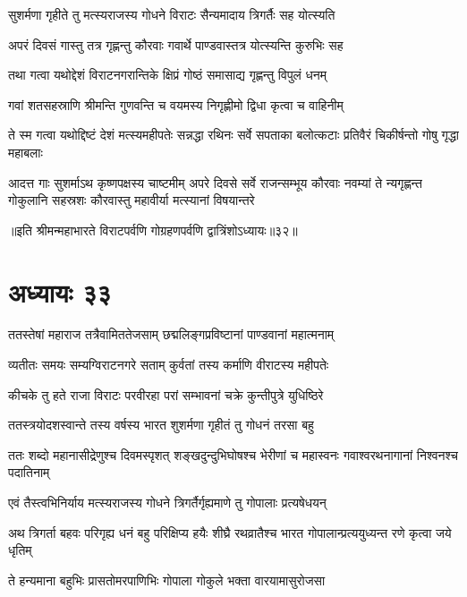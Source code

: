 \twolineshloka
{सुशर्मणा गृहीते तु मत्स्यराजस्य गोधने}
{विराटः सैन्यमादाय त्रिगर्तैः सह योत्स्यति}


\twolineshloka
{अपरं दिवसं गास्तु तत्र गृह्णन्तु कौरवाः}
{गवार्थे पाण्डवास्तत्र योत्स्यन्ति कुरुभिः सह}


\twolineshloka
{तथा गत्वा यथोद्देशं विराटनगरान्तिके}
{क्षिप्रं गोष्ठं समासाद्य गृह्णन्तु विपुलं धनम्}


\twolineshloka
{गवां शतसहस्राणि श्रीमन्ति गुणवन्ति च}
{वयमस्य निगृह्णीमो द्विधा कृत्वा च वाहिनीम्}



\threelineshloka
{ते स्म गत्वा यथोद्दिष्टं देशं मत्स्यमहीपतेः}
{सन्नद्धा रथिनः सर्वे सपताका बलोत्कटाः}
{प्रतिवैरं चिकीर्षन्तो गोषु गृद्धा महाबलाः}


\onelineshloka
{आदत्त गाः सुशर्माऽथ कृष्णपक्षस्य चाष्टमीम्}
\threelineshloka
{अपरे दिवसे सर्वे राजन्सम्भूय कौरवाः}
{नवम्यां ते न्यगृह्णन्त गोकुलानि सहस्रशः}
{कौरवास्तु महावीर्या मत्स्यानां विषयान्तरे}

॥इति श्रीमन्महाभारते विराटपर्वणि गोग्रहणपर्वणि द्वात्रिंशोऽध्यायः॥३२॥

\chapter{अध्यायः ३३}

\twolineshloka
{ततस्तेषां महाराज तत्रैवामिततेजसाम्}
{छद्मलिङ्गप्रविष्टानां पाण्डवानां महात्मनाम्}


\twolineshloka
{व्यतीतः समयः सम्यग्विराटनगरे सताम्}
{कुर्वतां तस्य कर्माणि वीराटस्य महीपतेः}


\twolineshloka
{कीचके तु हते राजा विराटः परवीरहा}
{परां सम्भावनां चक्रे कुन्तीपुत्रे युधिष्ठिरे}


\twolineshloka
{ततस्त्रयोदशस्वान्ते तस्य वर्षस्य भारत}
{शुशर्मणा गृहीतं तु गोधनं तरसा बहु}


\threelineshloka
{ततः शब्दो महानासीद्रेणुश्च दिवमस्पृशत्}
{शङ्खदुन्दुभिघोषश्च भेरीणां च महास्वनः}
{गवाश्वरथनागानां निश्वनश्च पदातिनाम्}


\twolineshloka
{एवं तैस्त्वभिनिर्याय मत्स्यराजस्य गोधने}
{त्रिगर्तैर्गृह्यमाणे तु गोपालाः प्रत्यषेधयन्}


\threelineshloka
{अथ त्रिगर्ता बहवः परिगृह्य धनं बहु}
{परिक्षिप्य हयैः शीघ्रै रथव्रातैश्च भारत}
{गोपालान्प्रत्ययुध्यन्त रणे कृत्वा जये धृतिम्}


\twolineshloka
{ते हन्यमाना बहुभिः प्रासतोमरपाणिभिः}
{गोपाला गोकुले भक्ता वारयामासुरोजसा}



